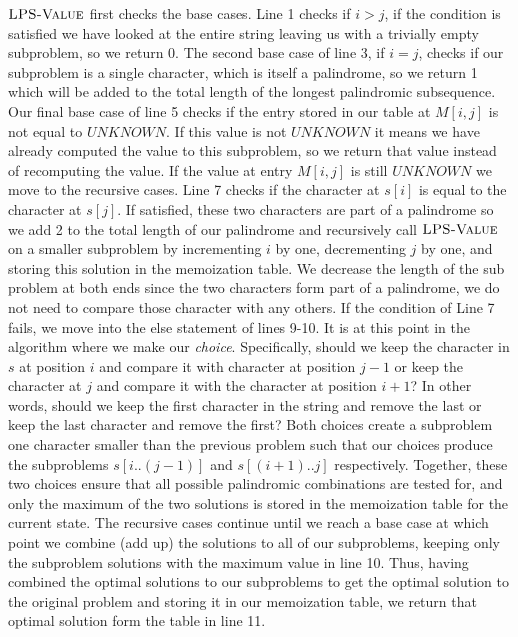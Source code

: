 \documentclass[11pt]{article}
\theoremstyle{nonumberplain}
\begin{document}
\begin{enumerate}
  $\textnormal{\scshape LPS-Value}$ first checks the base cases. Line 1 checks if $i>j$, if the condition is satisfied we have looked at the entire string leaving us with a trivially empty subproblem, so we return 0. The second base case of line 3, if $i=j$, checks if our subproblem is a single character, which is itself a palindrome, so we return 1 which will be added to the total length of the longest palindromic subsequence. Our final base case of line 5 checks if the entry stored in our table at $M[i,j]$ is not equal to $UNKNOWN$. If this value is not $UNKNOWN$ it means we have already computed the value to this subproblem, so we return that value instead of recomputing the value. If the value at entry $M[i,j]$ is still $UNKNOWN$ we move to the recursive cases. Line 7 checks if the character at $s[i]$ is equal to the character at $s[j]$. If satisfied, these two characters are part of a palindrome so we add 2 to the total length of our palindrome and recursively call $\textnormal{\scshape LPS-Value}$ on a smaller subproblem by incrementing $i$ by one, decrementing $j$ by one, and storing this solution in the memoization table. We decrease the length of the sub problem at both ends since the two characters form part of a palindrome, we do not need to compare those character with any others. If the condition of Line 7 fails, we move into the else statement of lines 9-10. It is at this point in the algorithm where we make our \emph{choice}. Specifically, should we keep the character in $s$ at position $i$ and compare it with character at position $j-1$ or keep the character at $j$ and compare it with the character at position $i+1$? In other words, should we keep the first character in the string and remove the last or keep the last character and remove the first? Both choices create a subproblem one character smaller than the previous problem such that our choices produce the subproblems $s[i..(j-1)]$ and $s[(i+1)..j]$ respectively. Together, these two choices ensure that all possible palindromic combinations are tested for, and only the maximum of the two solutions is stored in the memoization table for the current state. The recursive cases continue until we reach a base case at which point we combine (add up) the solutions to all of our subproblems, keeping only the subproblem solutions with the maximum value in line 10. Thus, having combined the optimal solutions to our subproblems to get the optimal solution to the original problem and storing it in our memoization table, we return that optimal solution form the table in line 11.\\
  \newpage

\end{enumerate}
\end{document}
